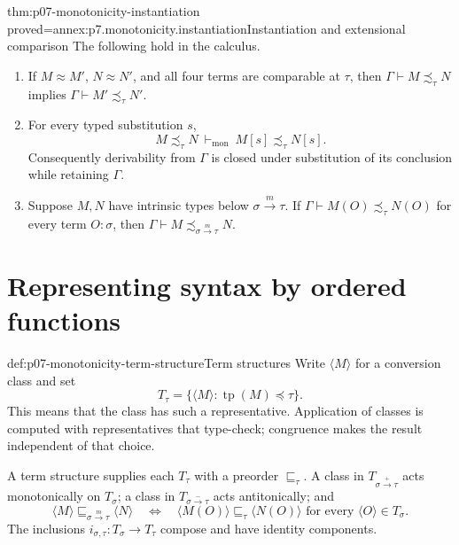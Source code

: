 \begin{hblemma}{thm:p07-monotonicity-instantiation}
 {proved=annex:p7.monotonicity.instantiation}{Instantiation and extensional comparison}
The following hold in the calculus.
\begin{enumerate}
 \item If \(M\approx M'\), \(N\approx N'\), and all four terms are
       comparable at \(\tau\), then
       \(\Gamma\vdash M\precsim_\tau N\) implies
       \(\Gamma\vdash M'\precsim_\tau N'\).
 \item For every typed substitution \(s\),
       \[
       M\precsim_\tau N\ \vdash_{\mathrm{mon}}\
       M[s]\precsim_\tau N[s].
       \]
       Consequently derivability from \(\Gamma\) is closed under
       substitution of its conclusion while retaining \(\Gamma\).
 \item Suppose \(M,N\) have intrinsic types below
       \(\sigma\xrightarrow m\tau\). If
       \(\Gamma\vdash M(O)\precsim_\tau N(O)\) for every term
       \(O:\sigma\), then
       \(\Gamma\vdash M\precsim_{\sigma\xrightarrow m\tau}N\).
\end{enumerate}
\end{hblemma}

\section{Representing syntax by ordered functions}

\begin{hbdefinition}{def:p07-monotonicity-term-structure}{Term structures}
Write \(\langle M\rangle\) for a conversion class and set
\[
 T_\tau=\{\langle M\rangle:
            \operatorname{tp}(M)\preceq\tau\}.
\]
This means that the class has such a representative. Application of
classes is computed with representatives that type-check; congruence
makes the result independent of that choice.

A term structure supplies each \(T_\tau\) with a preorder
\(\sqsubseteq_\tau\). A class in \(T_{\sigma\xrightarrow+\tau}\)
acts monotonically on \(T_\sigma\); a class in
\(T_{\sigma\xrightarrow-\tau}\) acts antitonically; and
\[
 \langle M\rangle\sqsubseteq_{\sigma\xrightarrow m\tau}\langle N\rangle
 \quad\Longleftrightarrow\quad
 \langle M(O)\rangle\sqsubseteq_\tau\langle N(O)\rangle
 \text{ for every }\langle O\rangle\in T_\sigma .
\]
The inclusions \(i_{\sigma,\tau}:T_\sigma\to T_\tau\) compose and have
identity components.
\end{hbdefinition}

